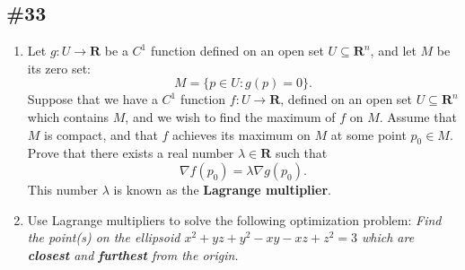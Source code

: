 \documentclass{article}
\newcommand{\R}{\mathbf{R}}
\theoremstyle{plain} %
\numberwithin{thm}{section} %
\theoremstyle{definition}
\begin{document}
        \subsection{\#33}
        \begin{enumerate}[label=(\alph*)]
            \item Let $g:U\rightarrow \R$ be a $C^1$ function defined on an open set $U\subseteq \R^n$, and let $M$ be its zero set:
                \[ M = \{ p\in U : g(p)=0 \}. \]
            Suppose that we have a $C^1$ function $f:U\rightarrow \R$, defined on an open set $U\subseteq \R^n$ which contains $M$, and we wish to find the maximum of $f$ on $M$. Assume that $M$ is compact, and that $f$ achieves its maximum on $M$ at some point $p_0\in M$. Prove that there exists a real number $\lambda \in \R$ such that
                \[ \nabla f(p_0) = \lambda \nabla g(p_0). \]
            This number $\lambda$ is known as the \textbf{Lagrange multiplier}.
    
            \item Use Lagrange multipliers to solve the following optimization problem: \textit{Find the point(s) on the ellipsoid $x^2 + yz + y^2 - xy - xz + z^2 = 3$ which are \textbf{closest} and \textbf{furthest} from the origin.}
        \end{enumerate}
\end{document}
